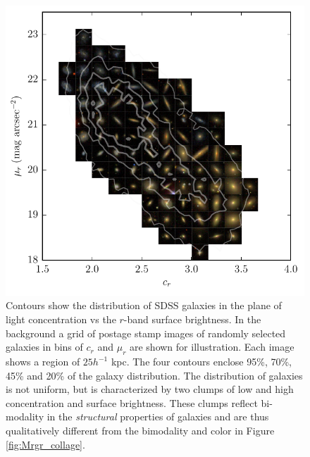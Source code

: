 \begin{figure}[!th]
\centerline{
\includegraphics[scale=1.2]{fig/crmur_collage.pdf}}
\caption{Contours show the distribution of SDSS galaxies in the plane of light concentration vs the $r$-band surface brightness. In the background a grid of postage stamp images of randomly selected galaxies in bins of $c_r$ and $\mu_r$ are shown for illustration. Each image shows a region of $25h^{-1}$ kpc. The four contours enclose 95\%, 70\%, 45\% and 20\% of the galaxy distribution. The distribution of galaxies is not uniform, but is characterized by two clumps of low and high concentration and surface brightness. These clumps reflect bi-modality in the {\it structural} properties of galaxies and are thus qualitatively different from the bimodality and color in Figure \ref{fig:Mrgr_collage}. \label{fig:crmur_collage}}
\end{figure}

